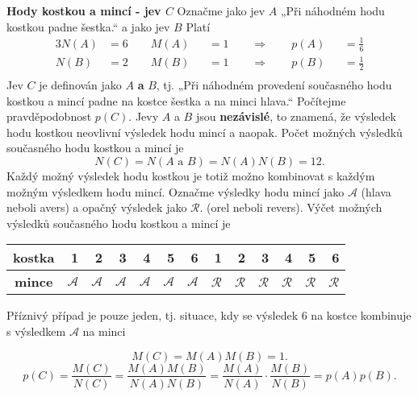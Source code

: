 \wikitextrule
\begin{example}\label{mai:exam055}
  \textbf{Hody kostkou a mincí - jev \(C\)}\newline\small
  Označme jako jev \(A\) „Při náhodném hodu kostkou padne šestka.“ a jako jev \(B\)  Platí
  \begin{alignat*}{3}
    N(A) &= 6\qquad   M(A) &&=1 \qquad \Rightarrow \qquad p(A) &&= \frac{1}{6}  \\
    N(B) &= 2\qquad   M(B) &&=1 \qquad \Rightarrow \qquad p(B) &&= \frac{1}{2}  \\
  \end{alignat*}
  Jev \(C\) je definován jako \(A\) \textbf{a} \(B\), tj. „Při náhodném provedení současného hodu 
  kostkou a mincí padne na kostce šestka a na minci hlava.“ Počítejme pravděpodobnost \(p(C)\). 
  Jevy \(A\) a \(B\) jsou \textbf{nezávislé}, to znamená, že výsledek hodu kostkou neovlivní 
  výsledek hodu mincí a naopak. Počet možných výsledků současného hodu kostkou a mincí je
  \begin{equation*}
    N(C) = N(A \text{ a } B) = N(A)N(B) = 12.
  \end{equation*}
  Každý možný výsledek hodu kostkou je totiž možno kombinovat s každým možným výsledkem hodu mincí.
  Označme výsledky hodu mincí jako \(\mathcal{A}\) (hlava neboli avers) a opačný výsledek jako 
  \(\mathcal{R}\). (orel neboli revers). Výčet možných výsledků současného hodu kostkou a mincí je

  \begin{table}[h]
    \centering
    \begin{tabular}{c|rrrrrrrrrrrr}
      \textbf{kostka} & 1 & 2 & 3 & 4 & 5 & 6 & 1 & 2 & 3 & 4 & 5 & 6 \\ \hline
      \textbf{mince}  & \(\mathcal{A}\) & \(\mathcal{A}\) & \(\mathcal{A}\) & \(\mathcal{A}\) & 
                        \(\mathcal{A}\) & \(\mathcal{A}\) & \(\mathcal{R}\) & \(\mathcal{R}\) & 
                        \(\mathcal{R}\) & \(\mathcal{R}\) & \(\mathcal{R}\) & \(\mathcal{R}\) 
    \end{tabular}
  \end{table}
  
  Příznivý případ je pouze jeden, tj. situace, kdy se výsledek \num{6} na kostce kombinuje s 
  výsledkem \(\mathcal{A}\) na minci
  
  \begin{equation*}
    M(C) = M(A)M(B) = 1.
  \end{equation*}
  \begin{equation*}
    p(C) = \dfrac{M(C)}{N(C)} = \dfrac{M(A)M(B)}{N(A)N(B)} 
         = \dfrac{M(A)}{N(A)}\cdot\dfrac{M(B)}{N(B)} = p(A)p(B).
  \end{equation*}
  \normalsize
\end{example}